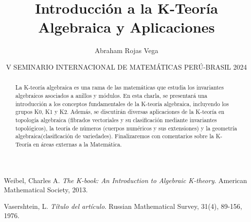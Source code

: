 \documentclass[12pt]{article}
\title{Introducción a la K-Teoría Algebraica y Aplicaciones}
\author{Abraham Rojas Vega}
\date{V SEMINARIO INTERNACIONAL DE MATEMÁTICAS PERÚ-BRASIL 2024}
\begin{document}
\maketitle

\begin{abstract}
La K-teoría algebraica es una rama de las matemáticas que estudia los invariantes algebraicos asociados a anillos y módulos. En esta charla, se presentará una introducción a los conceptos fundamentales de la K-teoría algebraica, incluyendo los grupos K0, K1 y K2. Además, se discutirán diversas aplicaciones de la K-teoría en topología algebraica (fibrados vectoriales y su clasificación mediante invariantes topológicos), la teoría de números (cuerpos numéricos y sus extensiones) y la geometría algebraica(clasificación de variedades). Finalizaremos con comentarios sobre la K-Teoría en áreas externas a la Matemática.

\end{abstract}

\begin{thebibliography}{9}
Weibel, Charles A.
\textit{The K-book: An Introduction to Algebraic K-theory}.
American Mathematical Society, 2013.

Vasershtein, L.
\textit{Título del artículo}.
Russian Mathematical Survey, 31(4), 89-156, 1976.
\end{thebibliography}
\end{document}
